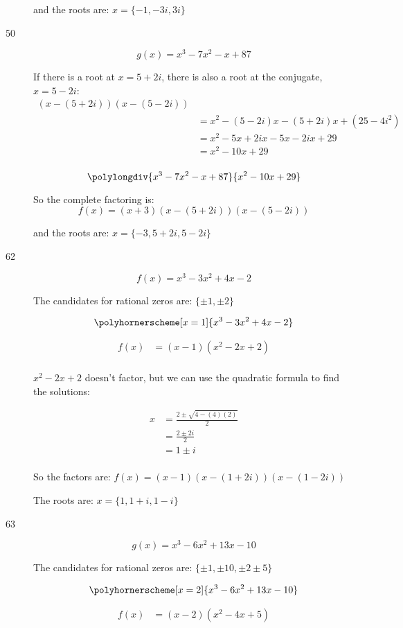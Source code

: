 \documentclass[fleqn,addpoints]{exam}
\begin{document}
\begin{description}
and the roots are: $x = \{ -1, -3i, 3i \}$

\item[50]
\[
  g(x) = x^3-7x^2-x+87
\]

If there is a root at $x=5+2i$, there is also a root at the conjugate, $x=5-2i$:
\begin{align*}
  (x-(5+2i))(x-(5-2i)) & \\
  & = x^2 - (5-2i)x - (5+2i)x + (25 -4i^2) \\
  &= x^2 -5x + 2ix - 5x -2ix + 29 \\
  &= x^2 -10x + 29 \\
\end{align*}

\[ 
  \polylongdiv{ x^3-7x^2-x+87}{x^2 -10x + 29} 
\]

So the complete factoring is:
\[
  f(x) = (x+3)(x - (5+2i) )(x- (5 - 2i))
\]

and the roots are: $x = \{ -3, 5+2i, 5-2i \}$

\item[62]
\[ 
  f(x) = x^3 - 3x^2 + 4x - 2 
\]

The candidates for rational zeros are: $\{\pm 1, \pm 2 \}$

\[ 
  \polyhornerscheme[x=1]{x^3 - 3x^2 + 4x - 2}
\]

\begin{align*}
  f(x) &=  (x-1)(x^2 - 2x + 2) \\
\end{align*}

$x^2-2x+2$ doesn't factor, but we can use the quadratic formula to find the solutions:

\begin{align*}
  x &= \frac{2 \pm \sqrt{4 - (4)(2)}}{2} \\
    &= \frac{2 \pm 2i}{2} \\
    &= 1 \pm i \\
\end{align*}

So the factors are: $f(x) = (x-1)(x - (1 + 2i))(x - (1-2i))$

The roots are: $x = \{1, 1+i, 1-i \}$

\item[63]
\[ 
  g(x) = x^3-6x^2+13x-10
\]

The candidates for rational zeros are: $\{\pm 1, \pm 10, \pm 2 \pm 5 \}$

\[ 
  \polyhornerscheme[x=2]{x^3-6x^2+13x-10}
\]

\begin{align*}
  f(x) &=  (x-2)(x^2 - 4x + 5) \\
\end{align*}


\end{description}
\end{document}
